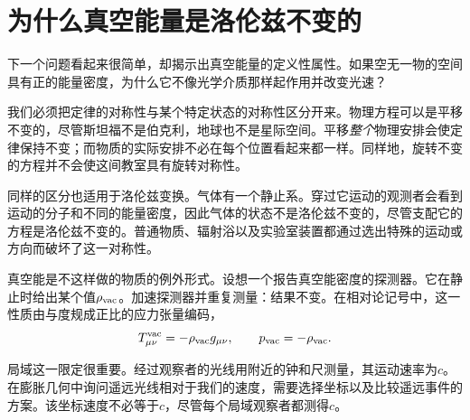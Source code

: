 \begin{classroomqa}
\end{classroomqa}

\section{为什么真空能量是洛伦兹不变的}

下一个问题看起来很简单，却揭示出真空能量的定义性属性。如果空无一物的空间具有正的能量密度，为什么它不像光学介质那样起作用并改变光速？

\begin{classroomqa}
\end{classroomqa}

我们必须把定律的对称性与某个特定状态的对称性区分开来。物理方程可以是平移不变的，尽管斯坦福不是伯克利，地球也不是星际空间。平移\emph{整个}物理安排会使定律保持不变；而物质的实际安排不必在每个位置看起来都一样。同样地，旋转不变的方程并不会使这间教室具有旋转对称性。

同样的区分也适用于洛伦兹变换。气体有一个静止系。穿过它运动的观测者会看到运动的分子和不同的能量密度，因此气体的状态不是洛伦兹不变的，尽管支配它的方程是洛伦兹不变的。普通物质、辐射浴以及实验室装置都通过选出特殊的运动或方向而破坏了这一对称性。

真空能是不这样做的物质的例外形式。设想一个报告真空能密度的探测器。它在静止时给出某个值\(\rho_{\rm vac}\)。加速探测器并重复测量：结果不变。在相对论记号中，这一性质由与度规成正比的应力张量编码，
\begin{equation}
T_{\mu\nu}^{\rm vac}=-\rho_{\rm vac}g_{\mu\nu},
\qquad
p_{\rm vac}=-\rho_{\rm vac}.
\label{eq:l08-vacuum-stress}
\end{equation}

局域这一限定很重要。经过观察者的光线用附近的钟和尺测量，其运动速率为\(c\)。在膨胀几何中询问遥远光线相对于我们的速度，需要选择坐标以及比较遥远事件的方案。该坐标速度不必等于\(c\)，尽管每个局域观察者都测得\(c\)。

